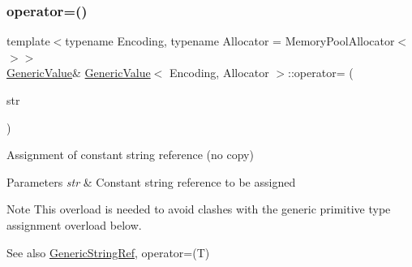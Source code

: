 \subsubsection{\texorpdfstring{operator=()}{operator=()}\hspace{0.1cm}{\footnotesize\ttfamily [4/4]}}
{\footnotesize\ttfamily template$<$typename Encoding, typename Allocator = Memory\+Pool\+Allocator$<$$>$$>$ \\
\hyperlink{classGenericValue}{Generic\+Value}\& \hyperlink{classGenericValue}{Generic\+Value}$<$ Encoding, Allocator $>$\+::operator= (\begin{DoxyParamCaption}\item[{\hyperlink{classGenericValue_a32e0f30ee278072374c8168b14d3317f}{String\+Ref\+Type}}]{str }\end{DoxyParamCaption})\hspace{0.3cm}{\ttfamily [inline]}}



Assignment of constant string reference (no copy) 


\begin{DoxyParams}{Parameters}
{\em str} & Constant string reference to be assigned \\
\hline
\end{DoxyParams}
\begin{DoxyNote}{Note}
This overload is needed to avoid clashes with the generic primitive type assignment overload below. 
\end{DoxyNote}
\begin{DoxySeeAlso}{See also}
\hyperlink{structGenericStringRef}{Generic\+String\+Ref}, operator=(\+T) 
\end{DoxySeeAlso}
\mbox{\label{classGenericValue_a4a4418a93777942e1fb7ea71f8aaf680}} 
